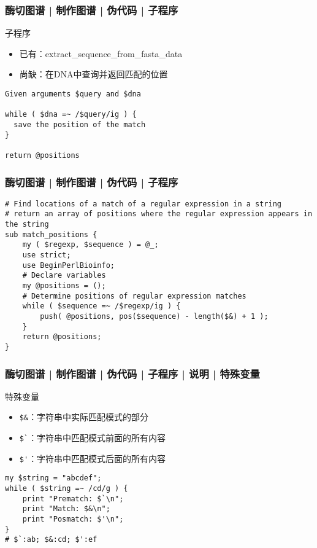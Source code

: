 \begin{frame}[fragile]
  \frametitle{酶切图谱 | 制作图谱 | 伪代码 | 子程序}
  \begin{block}{子程序}
    \begin{itemize}
      \item 已有：extract\_sequence\_from\_fasta\_data
      \item 尚缺：在DNA中查询并返回匹配的位置
    \end{itemize}
  \end{block}
  \pause
\begin{lstlisting}
Given arguments $query and $dna

while ( $dna =~ /$query/ig ) {
  save the position of the match
}

return @positions
\end{lstlisting}
\end{frame}

\begin{frame}[fragile]
  \frametitle{酶切图谱 | 制作图谱 | 伪代码 | \alert{子程序}}
  \vspace{-0.6em}
\begin{lstlisting}[basicstyle=\small\tt,numberstyle=\footnotesize]
# Find locations of a match of a regular expression in a string
# return an array of positions where the regular expression appears in the string
sub match_positions {
    my ( $regexp, $sequence ) = @_;
    use strict;
    use BeginPerlBioinfo;
    # Declare variables
    my @positions = ();
    # Determine positions of regular expression matches
    while ( $sequence =~ /$regexp/ig ) {
        push( @positions, pos($sequence) - length($&) + 1 );
    }
    return @positions;
}
\end{lstlisting}
\end{frame}

\begin{frame}[fragile]
  \frametitle{酶切图谱 | 制作图谱 | 伪代码 | 子程序 | 说明 | \alert{特殊变量}}
  \begin{block}{特殊变量}
    \begin{itemize}
      \item \verb|$&|：字符串中实际匹配模式的部分
      \item \verb|$`|：字符串中匹配模式前面的所有内容
      \item \verb|$'|：字符串中匹配模式后面的所有内容
    \end{itemize}
  \end{block}
  \pause
\begin{lstlisting}
my $string = "abcdef";
while ( $string =~ /cd/g ) {
    print "Prematch: $`\n";
    print "Match: $&\n";
    print "Posmatch: $'\n";
}
# $`:ab; $&:cd; $':ef
\end{lstlisting}
\end{frame}

